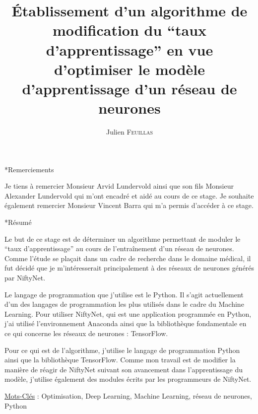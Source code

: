 \documentclass{book}
\title{\'Etablissement d'un algorithme de modification du ``taux d'apprentissage'' en vue d'optimiser le modèle d'apprentissage d'un réseau de neurones}
\author{Julien \textsc{Feuillas}}
\newcommand{\p}{\vspace{0.2cm}}
\begin{document}
	\mainmatter

	\pagedegarde

	\thispagestyle{empty}
	\pagestyle{plain}

	\cleardoublepage
	\renewcommand{\cleardoublepage}{\clearpage}

	\begin{section}*{Remerciements}
		Je tiens à remercier Monsieur Arvid Lundervold ainsi que son fils Monsieur Alexander Lundervold qui m'ont encadré et aidé au cours de ce stage. Je souhaite également remercier Monsieur Vincent Barra qui m'a permis d'accéder à ce stage.
	\end{section}
	\clearpage

	\begin{section}*{Résumé}

		Le but de ce stage est de déterminer un algorithme permettant de moduler le ``taux d'apprentissage'' au cours de l'entraînement d'un réseau de neurones. Comme l'étude se plaçait dans un cadre de recherche dans le domaine médical, il fut décidé que je m'intéresserait principalement à des réseaux de neurones générés par NiftyNet\cite{niftynet}.\p

		Le langage de programmation que j'utilise est le Python. Il s'agit actuellement d'un des langages de programmation les plus utilisés dans le cadre du Machine Learning. Pour utiliser NiftyNet, qui est une application programmée en Python, j'ai utilisé l'environnement Anaconda ainsi que la bibliothèque fondamentale en ce qui concerne les réseaux de neurones : TensorFlow.

		Pour ce qui est de l'algorithme, j'utilise le langage de programmation Python ainsi que la bibliothèque TensorFlow. Comme mon travail est de modifier la manière de réagir de NiftyNet suivant son avancement dans l'apprentissage du modèle, j'utilise également des modules écrits par les programmeurs de NiftyNet\cite{nifty}.\p

		\ul{Mots-Cl\'es} : Optimisation, Deep Learning, Machine Learning, réseau de neurones, Python

	\end{section}
\end{document}
